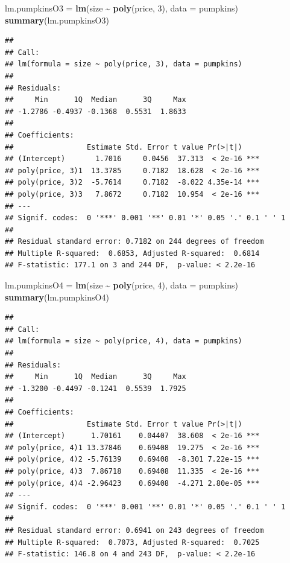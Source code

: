 \documentclass[
]{book}
\newenvironment{Shaded}{\begin{snugshade}}{\end{snugshade}}
\newcommand{\AttributeTok}[1]{\textcolor[rgb]{0.13,0.29,0.53}{#1}}
\newcommand{\DecValTok}[1]{\textcolor[rgb]{0.00,0.00,0.81}{#1}}
\newcommand{\FunctionTok}[1]{\textcolor[rgb]{0.13,0.29,0.53}{\textbf{#1}}}
\newcommand{\NormalTok}[1]{#1}
\newcommand{\OtherTok}[1]{\textcolor[rgb]{0.56,0.35,0.01}{#1}}
\newcommand{\SpecialCharTok}[1]{\textcolor[rgb]{0.81,0.36,0.00}{\textbf{#1}}}
\begin{document}
\begin{Shaded}
\begin{Highlighting}[]
\NormalTok{lm.pumpkinsO3 }\OtherTok{=} \FunctionTok{lm}\NormalTok{(size }\SpecialCharTok{\textasciitilde{}} \FunctionTok{poly}\NormalTok{(price, }\DecValTok{3}\NormalTok{), }\AttributeTok{data =}\NormalTok{ pumpkins)}
\FunctionTok{summary}\NormalTok{(lm.pumpkinsO3)}
\end{Highlighting}
\end{Shaded}

\begin{verbatim}
## 
## Call:
## lm(formula = size ~ poly(price, 3), data = pumpkins)
## 
## Residuals:
##     Min      1Q  Median      3Q     Max 
## -1.2786 -0.4937 -0.1368  0.5531  1.8633 
## 
## Coefficients:
##                 Estimate Std. Error t value Pr(>|t|)    
## (Intercept)       1.7016     0.0456  37.313  < 2e-16 ***
## poly(price, 3)1  13.3785     0.7182  18.628  < 2e-16 ***
## poly(price, 3)2  -5.7614     0.7182  -8.022 4.35e-14 ***
## poly(price, 3)3   7.8672     0.7182  10.954  < 2e-16 ***
## ---
## Signif. codes:  0 '***' 0.001 '**' 0.01 '*' 0.05 '.' 0.1 ' ' 1
## 
## Residual standard error: 0.7182 on 244 degrees of freedom
## Multiple R-squared:  0.6853, Adjusted R-squared:  0.6814 
## F-statistic: 177.1 on 3 and 244 DF,  p-value: < 2.2e-16
\end{verbatim}

\begin{Shaded}
\begin{Highlighting}[]
\NormalTok{lm.pumpkinsO4 }\OtherTok{=} \FunctionTok{lm}\NormalTok{(size }\SpecialCharTok{\textasciitilde{}} \FunctionTok{poly}\NormalTok{(price, }\DecValTok{4}\NormalTok{), }\AttributeTok{data =}\NormalTok{ pumpkins)}
\FunctionTok{summary}\NormalTok{(lm.pumpkinsO4)}
\end{Highlighting}
\end{Shaded}

\begin{verbatim}
## 
## Call:
## lm(formula = size ~ poly(price, 4), data = pumpkins)
## 
## Residuals:
##     Min      1Q  Median      3Q     Max 
## -1.3200 -0.4497 -0.1241  0.5539  1.7925 
## 
## Coefficients:
##                 Estimate Std. Error t value Pr(>|t|)    
## (Intercept)      1.70161    0.04407  38.608  < 2e-16 ***
## poly(price, 4)1 13.37846    0.69408  19.275  < 2e-16 ***
## poly(price, 4)2 -5.76139    0.69408  -8.301 7.22e-15 ***
## poly(price, 4)3  7.86718    0.69408  11.335  < 2e-16 ***
## poly(price, 4)4 -2.96423    0.69408  -4.271 2.80e-05 ***
## ---
## Signif. codes:  0 '***' 0.001 '**' 0.01 '*' 0.05 '.' 0.1 ' ' 1
## 
## Residual standard error: 0.6941 on 243 degrees of freedom
## Multiple R-squared:  0.7073, Adjusted R-squared:  0.7025 
## F-statistic: 146.8 on 4 and 243 DF,  p-value: < 2.2e-16
\end{verbatim}
\end{document}
